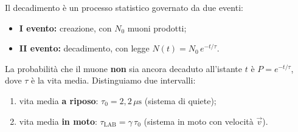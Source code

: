 Il decadimento è un processo statistico governato da due eventi:
\begin{itemize}
    \item \textbf{I evento:} creazione, con $N_0$ muoni prodotti;
    \item \textbf{II evento:} decadimento, con legge $N(t) = N_0 \, e^{-t/\tau}$.
\end{itemize}
La probabilità che il muone \textbf{non} sia ancora decaduto all'istante $t$ è $P = e^{-t/\tau}$, dove $\tau$ è la vita media. Distinguiamo due intervalli:
\begin{enumerate}
    \item vita media \textbf{a riposo}: $\tau_0 = 2{,}2 \, \mu\mathrm{s}$ (sistema di quiete);
    \item vita media \textbf{in moto}: $\tau_{\text{LAB}} = \gamma \, \tau_0$ (sistema in moto con velocità $\vec{v}$).
\end{enumerate}

